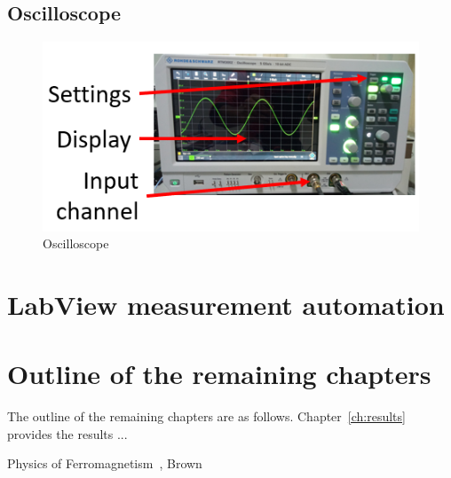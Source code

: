 \subsection{Oscilloscope}
\begin{figure}[H]
	\centering
   \includegraphics[scale=0.56]{Images/17.png} 
   \caption{Oscilloscope}
\end{figure}

\section{LabView measurement automation}


\section{\label{sec:outline}Outline of the remaining chapters}

The outline of the remaining chapters are as follows. Chapter~\ref{ch:results} provides the results ... 

Physics of Ferromagnetism~\cite{chika97}, Brown~\cite{brown68}